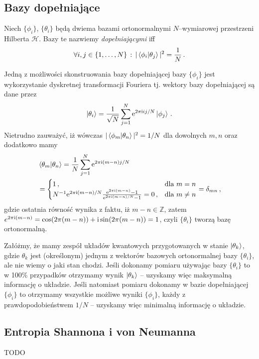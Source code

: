 \documentclass{myclass}
\begin{document}
\subsection{Bazy dopełniające}
\begin{definition}
    Niech \(\{\phi_i\}\), \(\{\theta_i\}\)  będą dwiema bazami ortonormalnymi \(N\)--wymiarowej
    przestrzeni Hilberta \(\mathscr{H}\). Bazy te nazwiemy \textit{dopełniającymi} iff
    \begin{equation*}
        \forall i,j\in\{1,\ldots,N\}\,:\, |\braket{\phi_i}{\theta_j}|^2 = \frac{1}{N}\,.
    \end{equation*}
\end{definition}
Jedną z możliwości skonstruowania bazy dopełniającej bazy \(\{\phi_i\}\) jest wykorzystanie
dyskretnej transformacji Fouriera tj. wektory bazy dopełniającej są dane przez
\begin{equation*}
    \ket{\theta_i} = \frac{1}{\sqrt{N}}\sum_{j=1}^N \mathrm{e}^{2\pi\mathrm{i} ij/N}\ket{\phi_j}\,.
\end{equation*}
Nietrudno zauważyć, iż wówczas \(|\braket{\phi_m}{\theta_n}|^2 = 1/N\) dla dowolnych \(m, n\) oraz
dodatkowo mamy
\begin{equation*}
    \begin{split}
        &\braket{\theta_m}{\theta_n} = \frac{1}{N}\sum_{j=1}^N \mathrm{e}^{2\pi\mathrm{i}(m - n)j/N} \\
        &= \begin{cases}
            1\,,&\text{dla \(m=n\)}\\
            N^{-1}\mathrm{e}^{2\pi\mathrm{i}(m-n)/N}\frac{\mathrm{e}^{2\pi\mathrm{i}(m-n)} - 1}{\mathrm{e}^{2\pi\mathrm{i}(m-n)/N} - 1} = 0\,,&\text{dla \(m\neq n\)}
        \end{cases} = \delta_{mn}\,,
    \end{split}
\end{equation*}
gdzie ostatnia równość wynika z faktu, iż \(m-n\in\mathbb{Z}\), zatem \(e^{2\pi\mathrm{i}(m-n)} =
\cos(2\pi(m-n)) + \mathrm{i}\sin(2\pi(m-n)) = 1\), czyli \(\{\theta_i\}\) tworzą bazę ortonormalną.

Załóżmy, że mamy zespół układów kwantowych przygotowanych w stanie \(\ket{\theta_k}\), gdzie
\(\theta_k\) jest (określonym) jednym z wektorów bazowych ortonormalnej bazy \(\{\theta_i\}\), ale
nie wiemy o jaki stan chodzi. Jeśli dokonamy pomiaru używając bazy \(\{\theta_i\}\) to w 100\%
przypadków otrzymamy wynik \(\ket{\theta_k}\) -- uzyskamy więc maksymalną informację o układzie.
Jeśli natomiast pomiaru dokonamy w bazie dopełniającej \(\{\phi_i\}\) to otrzymamy wszystkie możliwe
wyniki \(\{\phi_i\}\), każdy z prawdopodobieństwem \(1/N\) -- uzyskamy więc minimalną informację o
układzie.


\subsection{Entropia Shannona i von Neumanna}

TODO
\end{document}
